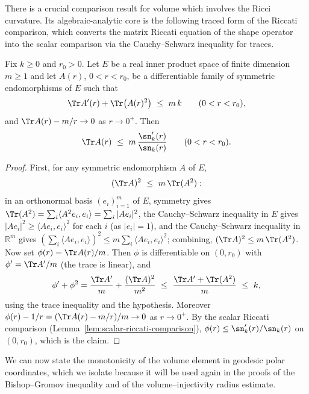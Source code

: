 There is a crucial comparison result for volume which involves the
Ricci curvature. Its algebraic-analytic core is the following traced
form of the Riccati comparison, which converts the matrix Riccati
equation of the shape operator into the scalar comparison via the
Cauchy--Schwarz inequality for traces.

\begin{lemma}
\label{lem:trace-riccati-comparison}
\leanok
Fix $k\ge0$ and $r_0>0$. Let $E$ be a real inner product space of
finite dimension $m\ge1$ and let $A(r)$, $0<r<r_0$, be a
differentiable family of symmetric endomorphisms of $E$ such that
$$\Tr A'(r)+\Tr\!\left(A(r)^2\right)\ \le\ m\,k
\qquad(0<r<r_0),$$
and $\Tr A(r)-m/r\to0$ as $r\to0^+$. Then
$$\Tr A(r)\ \le\ m\,\frac{\sn_k'(r)}{\sn_k(r)}\qquad(0<r<r_0).$$
\end{lemma}

\begin{proof}
\leanok
First, for any symmetric endomorphism $A$ of $E$,
$$(\Tr A)^2\ \le\ m\,\Tr(A^2):$$
in an orthonormal basis $(e_i)_{i=1}^m$ of $E$, symmetry gives
$\Tr(A^2)=\sum_i\langle A^2e_i,e_i\rangle=\sum_i|Ae_i|^2$, the
Cauchy--Schwarz inequality in $E$ gives
$|Ae_i|^2\ge\langle Ae_i,e_i\rangle^2$ for each $i$ (as $|e_i|=1$),
and the Cauchy--Schwarz inequality in $\mathbb{R}^m$ gives
$\left(\sum_i\langle Ae_i,e_i\rangle\right)^2
\le m\sum_i\langle Ae_i,e_i\rangle^2$; combining,
$(\Tr A)^2\le m\,\Tr(A^2)$. Now set $\phi(r)=\Tr A(r)/m$. Then
$\phi$ is differentiable on $(0,r_0)$ with $\phi'=\Tr A'/m$ (the
trace is linear), and
$$\phi'+\phi^2=\frac{\Tr A'}{m}+\frac{(\Tr A)^2}{m^2}
\ \le\ \frac{\Tr A'+\Tr(A^2)}{m}\ \le\ k,$$
using the trace inequality and the hypothesis. Moreover
$\phi(r)-1/r=(\Tr A(r)-m/r)/m\to0$ as $r\to0^+$. By the scalar
Riccati comparison (Lemma~\ref{lem:scalar-riccati-comparison}),
$\phi(r)\le\sn_k'(r)/\sn_k(r)$ on $(0,r_0)$, which is the claim.
\end{proof}

We can now state the monotonicity of the volume element in geodesic
polar coordinates, which we isolate because it will be used again in
the proofs of the Bishop--Gromov inequality and of the
volume--injectivity radius estimate.

